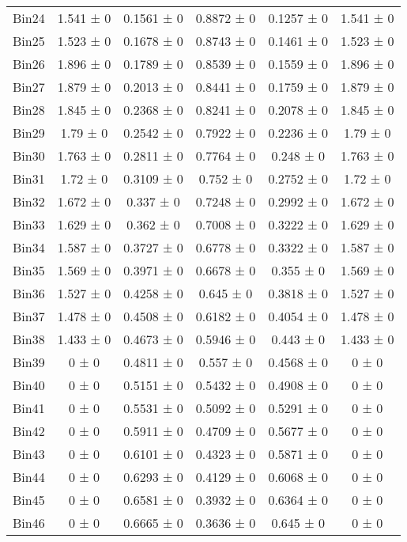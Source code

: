 \begin{tabular}{@{\extracolsep{4pt}}lccccc@{}}
     Bin24 & 1.541 ± 0 & 0.1561 ± 0 & 0.8872 ± 0 & 0.1257 ± 0 & 1.541 ± 0 \\ 
     Bin25 & 1.523 ± 0 & 0.1678 ± 0 & 0.8743 ± 0 & 0.1461 ± 0 & 1.523 ± 0 \\ 
     Bin26 & 1.896 ± 0 & 0.1789 ± 0 & 0.8539 ± 0 & 0.1559 ± 0 & 1.896 ± 0 \\ 
     Bin27 & 1.879 ± 0 & 0.2013 ± 0 & 0.8441 ± 0 & 0.1759 ± 0 & 1.879 ± 0 \\ 
     Bin28 & 1.845 ± 0 & 0.2368 ± 0 & 0.8241 ± 0 & 0.2078 ± 0 & 1.845 ± 0 \\ 
     Bin29 & 1.79 ± 0 & 0.2542 ± 0 & 0.7922 ± 0 & 0.2236 ± 0 & 1.79 ± 0 \\ 
     Bin30 & 1.763 ± 0 & 0.2811 ± 0 & 0.7764 ± 0 & 0.248 ± 0 & 1.763 ± 0 \\ 
     Bin31 & 1.72 ± 0 & 0.3109 ± 0 & 0.752 ± 0 & 0.2752 ± 0 & 1.72 ± 0 \\ 
     Bin32 & 1.672 ± 0 & 0.337 ± 0 & 0.7248 ± 0 & 0.2992 ± 0 & 1.672 ± 0 \\ 
     Bin33 & 1.629 ± 0 & 0.362 ± 0 & 0.7008 ± 0 & 0.3222 ± 0 & 1.629 ± 0 \\ 
     Bin34 & 1.587 ± 0 & 0.3727 ± 0 & 0.6778 ± 0 & 0.3322 ± 0 & 1.587 ± 0 \\ 
     Bin35 & 1.569 ± 0 & 0.3971 ± 0 & 0.6678 ± 0 & 0.355 ± 0 & 1.569 ± 0 \\ 
     Bin36 & 1.527 ± 0 & 0.4258 ± 0 & 0.645 ± 0 & 0.3818 ± 0 & 1.527 ± 0 \\ 
     Bin37 & 1.478 ± 0 & 0.4508 ± 0 & 0.6182 ± 0 & 0.4054 ± 0 & 1.478 ± 0 \\ 
     Bin38 & 1.433 ± 0 & 0.4673 ± 0 & 0.5946 ± 0 & 0.443 ± 0 & 1.433 ± 0 \\ 
     Bin39 & 0 ± 0 & 0.4811 ± 0 & 0.557 ± 0 & 0.4568 ± 0 & 0 ± 0 \\ 
     Bin40 & 0 ± 0 & 0.5151 ± 0 & 0.5432 ± 0 & 0.4908 ± 0 & 0 ± 0 \\ 
     Bin41 & 0 ± 0 & 0.5531 ± 0 & 0.5092 ± 0 & 0.5291 ± 0 & 0 ± 0 \\ 
     Bin42 & 0 ± 0 & 0.5911 ± 0 & 0.4709 ± 0 & 0.5677 ± 0 & 0 ± 0 \\ 
     Bin43 & 0 ± 0 & 0.6101 ± 0 & 0.4323 ± 0 & 0.5871 ± 0 & 0 ± 0 \\ 
     Bin44 & 0 ± 0 & 0.6293 ± 0 & 0.4129 ± 0 & 0.6068 ± 0 & 0 ± 0 \\ 
     Bin45 & 0 ± 0 & 0.6581 ± 0 & 0.3932 ± 0 & 0.6364 ± 0 & 0 ± 0 \\ 
     Bin46 & 0 ± 0 & 0.6665 ± 0 & 0.3636 ± 0 & 0.645 ± 0 & 0 ± 0 \\ 

\end{tabular}
